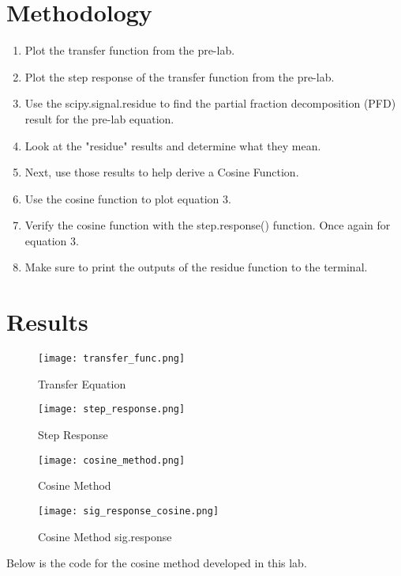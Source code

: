 \documentclass[12pt]{article}
\begin{document}
\section*{Methodology}
 \begin{enumerate}
    \item Plot the transfer function from the pre-lab.
    \item Plot the step response of the transfer function from the pre-lab.
    \item Use the scipy.signal.residue to find the partial fraction decomposition (PFD) result for the pre-lab equation.
    \item Look at the "residue" results and determine what they mean.
    \item Next, use those results to help derive a Cosine Function.
    \item Use the cosine function to plot equation 3.
    \item Verify the cosine function with the step.response() function. Once again for equation 3.
    \item Make sure to print the outputs of the residue function to the terminal.
 \end{enumerate}

\section*{Results}

\begin{figure}[H]
\caption{Transfer Equation}
\centering
\texttt{[image: transfer\_func.png]}
\end{figure}

\begin{figure}[H]
\caption{Step Response}
\centering
\texttt{[image: step\_response.png]}
\end{figure}

\begin{figure}[H]
\caption{Cosine Method}
\centering
\texttt{[image: cosine\_method.png]}
\end{figure}

\begin{figure}[H]
\caption{Cosine Method sig.response}
\centering
\texttt{[image: sig\_response\_cosine.png]}
\end{figure}

Below is the code for the cosine method developed in this lab.
\end{document}
